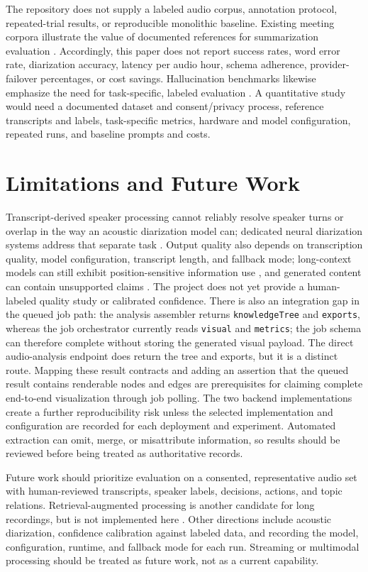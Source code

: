 \documentclass[conference]{IEEEtran}
\begin{document}
The repository does not supply a labeled audio corpus, annotation protocol, repeated-trial results, or reproducible monolithic baseline. Existing meeting corpora illustrate the value of documented references for summarization evaluation \cite{ami,qmsum,meetingbank,summn}. Accordingly, this paper does not report success rates, word error rate, diarization accuracy, latency per audio hour, schema adherence, provider-failover percentages, or cost savings. Hallucination benchmarks likewise emphasize the need for task-specific, labeled evaluation \cite{halueval}. A quantitative study would need a documented dataset and consent/privacy process, reference transcripts and labels, task-specific metrics, hardware and model configuration, repeated runs, and baseline prompts and costs.

\section{Limitations and Future Work}
Transcript-derived speaker processing cannot reliably resolve speaker turns or overlap in the way an acoustic diarization model can; dedicated neural diarization systems address that separate task \cite{pyannote,fujita}. Output quality also depends on transcription quality, model configuration, transcript length, and fallback mode; long-context models can still exhibit position-sensitive information use \cite{longcontext}, and generated content can contain unsupported claims \cite{hallucinationsurvey,halueval}. The project does not yet provide a human-labeled quality study or calibrated confidence. There is also an integration gap in the queued job path: the analysis assembler returns \texttt{knowledgeTree} and \texttt{exports}, whereas the job orchestrator currently reads \texttt{visual} and \texttt{metrics}; the job schema can therefore complete without storing the generated visual payload. The direct audio-analysis endpoint does return the tree and exports, but it is a distinct route. Mapping these result contracts and adding an assertion that the queued result contains renderable nodes and edges are prerequisites for claiming complete end-to-end visualization through job polling. The two backend implementations create a further reproducibility risk unless the selected implementation and configuration are recorded for each deployment and experiment. Automated extraction can omit, merge, or misattribute information, so results should be reviewed before being treated as authoritative records.

Future work should prioritize evaluation on a consented, representative audio set with human-reviewed transcripts, speaker labels, decisions, actions, and topic relations. Retrieval-augmented processing is another candidate for long recordings, but is not implemented here \cite{rag}. Other directions include acoustic diarization, confidence calibration against labeled data, and recording the model, configuration, runtime, and fallback mode for each run. Streaming or multimodal processing should be treated as future work, not as a current capability.
\end{document}
